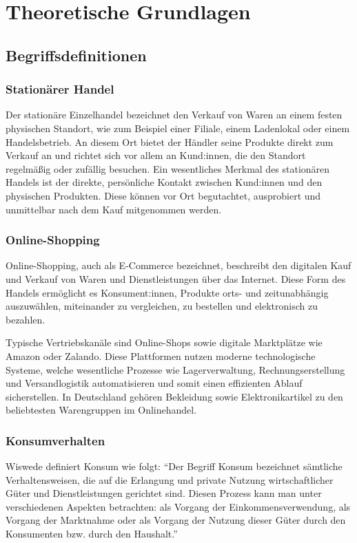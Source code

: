 \section{Theoretische Grundlagen}
\subsection{Begriffsdefinitionen}
\subsubsection{Stationärer Handel}
Der stationäre Einzelhandel bezeichnet den Verkauf von Waren an einem festen physischen Standort, wie zum Beispiel einer Filiale, einem Ladenlokal oder einem Handelsbetrieb. An diesem Ort bietet der Händler seine Produkte direkt zum Verkauf an und richtet sich vor allem an Kund:innen, die den Standort regelmäßig oder zufällig besuchen. Ein wesentliches Merkmal des stationären Handels ist der direkte, persönliche Kontakt zwischen Kund:innen und den physischen Produkten. Diese können vor Ort begutachtet, ausprobiert und unmittelbar nach dem Kauf mitgenommen werden.

\subsubsection{Online-Shopping}
Online-Shopping, auch als E-Commerce bezeichnet, beschreibt den digitalen Kauf und Verkauf von Waren und Dienstleistungen über das Internet. Diese Form des Handels ermöglicht es Konsument:innen, Produkte orts- und zeitunabhängig auszuwählen, miteinander zu vergleichen, zu bestellen und elektronisch zu bezahlen. 

Typische Vertriebskanäle sind Online-Shops sowie digitale Marktplätze wie Amazon oder Zalando. Diese Plattformen nutzen moderne technologische Systeme, welche wesentliche Prozesse wie Lagerverwaltung, Rechnungserstellung und Versandlogistik automatisieren und somit einen effizienten Ablauf sicherstellen. In Deutschland gehören Bekleidung sowie Elektronikartikel zu den beliebtesten Warengruppen im Onlinehandel.

\subsubsection{Konsumverhalten}
Wiswede definiert Konsum wie folgt: 
\enquote{Der Begriff Konsum bezeichnet sämtliche Verhaltensweisen, die auf die Erlangung und private Nutzung wirtschaftlicher Güter und Dienstleistungen gerichtet sind. Diesen Prozess kann man unter verschiedenen Aspekten betrachten: als Vorgang der Einkommensverwendung, als Vorgang der Marktnahme oder als Vorgang der Nutzung dieser Güter durch den Konsumenten bzw. durch den Haushalt.}

